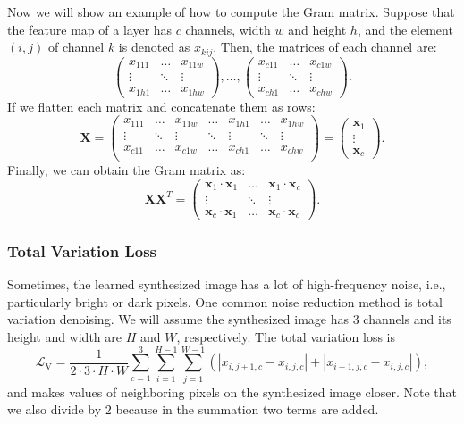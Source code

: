 Now we will show an example of how to compute the Gram matrix. Suppose that the feature map of a layer has $c$ channels, width $w$ and height $h$, and the element $(i, j)$ of channel $k$ is denoted as $x_{kij}$. Then, the matrices of each channel are:
$$
\begin{pmatrix}
x_{111} & \ldots & x_{11w} \\
\vdots & \ddots & \vdots \\
x_{1h1} & \ldots & x_{1hw}
\end{pmatrix}, \ldots,
\begin{pmatrix}
x_{c11} & \ldots & x_{c1w} \\
\vdots & \ddots & \vdots \\
x_{ch1} & \ldots & x_{chw}
\end{pmatrix}.
$$
If we flatten each matrix and concatenate them as rows:
$$
\mathbf{X} =
\begin{pmatrix}
x_{111} & \ldots & x_{11w} & \ldots & x_{1h1} & \ldots & x_{1hw} \\
\vdots & \ddots & \vdots & \ddots & \vdots & \ddots & \vdots \\
x_{c11} & \ldots & x_{c1w} & \ldots & x_{ch1} & \ldots & x_{chw} \\
\end{pmatrix} =
\begin{pmatrix}
\mathbf{x}_1 \\
\vdots \\
\mathbf{x}_c
\end{pmatrix}.
$$
Finally, we can obtain the Gram matrix as:
$$
\mathbf{X}\mathbf{X}^T =
\begin{pmatrix}
\mathbf{x}_1\cdot \mathbf{x}_1 & \ldots & \mathbf{x}_1\cdot \mathbf{x}_c \\
\vdots & \ddots & \vdots \\
\mathbf{x}_c\cdot \mathbf{x}_1 & \ldots & \mathbf{x}_c\cdot \mathbf{x}_c
\end{pmatrix}.
$$

\subsubsection{Total Variation Loss}

Sometimes, the learned synthesized image has a lot of high-frequency noise, i.e., particularly bright or dark pixels. One common noise reduction method is total variation denoising. We will assume the synthesized image has $3$ channels and its height and width are $H$ and $W$, respectively. The total variation loss is
$$\mathcal{L}_\text{V} = \dfrac{1}{2\cdot 3\cdot H\cdot W}\sum_{c=1}^3\sum_{i=1}^{H-1}\sum_{j=1}^{W-1}\left(\left|x_{i, j+1, c}-x_{i, j, c}\right| + \left| x_{i+1, j, c}-x_{i, j, c}\right|\right),$$
and makes values of neighboring pixels on the synthesized image closer. Note that we also divide by $2$ because in the summation two terms are added.

